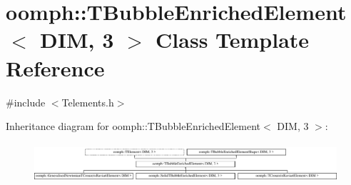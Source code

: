 \hypertarget{classoomph_1_1TBubbleEnrichedElement_3_01DIM_00_013_01_4}{}\section{oomph\+:\+:T\+Bubble\+Enriched\+Element$<$ D\+IM, 3 $>$ Class Template Reference}
\label{classoomph_1_1TBubbleEnrichedElement_3_01DIM_00_013_01_4}


{\ttfamily \#include $<$Telements.\+h$>$}

Inheritance diagram for oomph\+:\+:T\+Bubble\+Enriched\+Element$<$ D\+IM, 3 $>$\+:\begin{figure}[H]
\begin{center}
\leavevmode
\includegraphics[height=1.481482cm]{classoomph_1_1TBubbleEnrichedElement_3_01DIM_00_013_01_4}
\end{center}
\end{figure}
